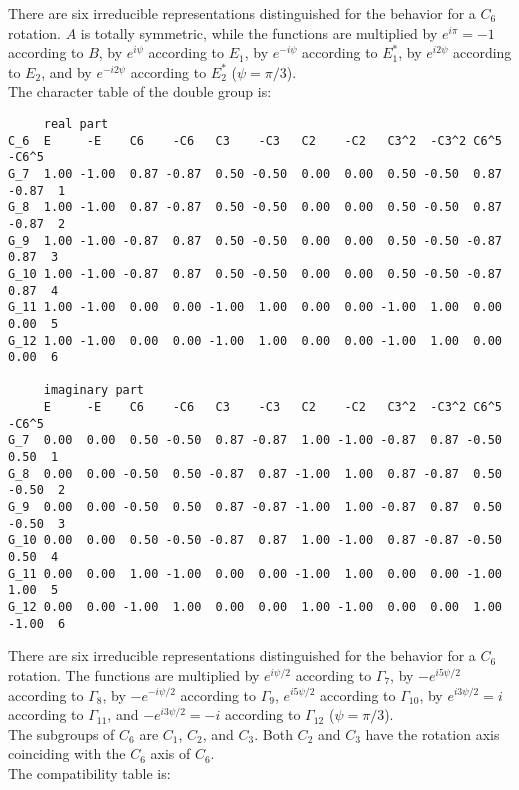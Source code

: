 \documentclass[12pt,a4paper,twoside]{report}
\begin{document}
There are six irreducible representations distinguished for
the behavior for a $C_6$ rotation. $A$ is totally symmetric, while
the functions are multiplied by $e^{i\pi}=-1$ according
to $B$, by $e^{i\psi}$ according to $E_1$, by $e^{-i\psi}$ 
according to $E_1^*$, by $e^{i2\psi}$ according to $E_2$, and by $e^{-i2\psi}$
according to $E_2^*$ ($\psi=\pi/3$). \\
The character table of the double group is:

\begin{tcolorbox}
\begin{scriptsize}
\begin{verbatim}
     real part
C_6  E     -E    C6    -C6   C3    -C3   C2    -C2   C3^2  -C3^2 C6^5  -C6^5
G_7  1.00 -1.00  0.87 -0.87  0.50 -0.50  0.00  0.00  0.50 -0.50  0.87 -0.87  1
G_8  1.00 -1.00  0.87 -0.87  0.50 -0.50  0.00  0.00  0.50 -0.50  0.87 -0.87  2
G_9  1.00 -1.00 -0.87  0.87  0.50 -0.50  0.00  0.00  0.50 -0.50 -0.87  0.87  3  
G_10 1.00 -1.00 -0.87  0.87  0.50 -0.50  0.00  0.00  0.50 -0.50 -0.87  0.87  4
G_11 1.00 -1.00  0.00  0.00 -1.00  1.00  0.00  0.00 -1.00  1.00  0.00  0.00  5
G_12 1.00 -1.00  0.00  0.00 -1.00  1.00  0.00  0.00 -1.00  1.00  0.00  0.00  6

     imaginary part
     E     -E    C6    -C6   C3    -C3   C2    -C2   C3^2  -C3^2 C6^5  -C6^5
G_7  0.00  0.00  0.50 -0.50  0.87 -0.87  1.00 -1.00 -0.87  0.87 -0.50  0.50  1
G_8  0.00  0.00 -0.50  0.50 -0.87  0.87 -1.00  1.00  0.87 -0.87  0.50 -0.50  2
G_9  0.00  0.00 -0.50  0.50  0.87 -0.87 -1.00  1.00 -0.87  0.87  0.50 -0.50  3
G_10 0.00  0.00  0.50 -0.50 -0.87  0.87  1.00 -1.00  0.87 -0.87 -0.50  0.50  4
G_11 0.00  0.00  1.00 -1.00  0.00  0.00 -1.00  1.00  0.00  0.00 -1.00  1.00  5
G_12 0.00  0.00 -1.00  1.00  0.00  0.00  1.00 -1.00  0.00  0.00  1.00 -1.00  6
\end{verbatim}
\end{scriptsize}
\end{tcolorbox}

There are six irreducible representations distinguished for the
behavior for a $C_6$ rotation. The functions are multiplied
by $e^{i\psi/2}$ according to $\Gamma_7$, by $-e^{i5\psi/2}$ 
according to $\Gamma_8$,
by $-e^{-i\psi/2}$ according to $\Gamma_9$, $e^{i5\psi/2}$ 
according to $\Gamma_{10}$,
by $e^{i3\psi/2}=i$ according to $\Gamma_{11}$, and $-e^{i3\psi/2}=-i$ according 
to $\Gamma_{12}$ ($\psi=\pi/3$). \\
The subgroups of $C_6$ are $C_1$, $C_2$, and $C_3$. Both $C_2$ and $C_3$ have
the rotation axis coinciding with the $C_6$ axis of $C_6$. \\
The compatibility table is:
\end{document}
